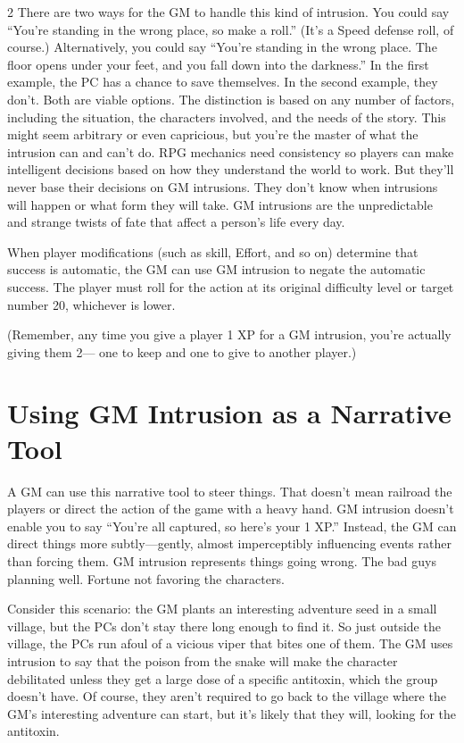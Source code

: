 \begin{multicols}{2}
There are two ways for the GM to handle this kind of intrusion. You could say “You’re standing in the wrong place, so make a roll.” (It’s a Speed defense roll, of course.) Alternatively, you could say “You’re standing in the wrong place. The floor opens under your feet, and you fall down into the darkness.” In the first example, the PC has a chance to save themselves. In the second example, they don’t. Both are viable options. The distinction is based on any number of factors, including the situation, the characters involved, and the needs of the story. This might seem arbitrary or even capricious, but you’re the master of what the intrusion can and can’t do. RPG mechanics need consistency so players can make intelligent decisions based on how they understand the world to work. But they’ll never base their decisions on GM intrusions. They don’t know when intrusions will happen or what form they will take. GM intrusions are the unpredictable and strange twists of fate that affect a person’s life every day.

When player modifications (such as skill, Effort, and so on) determine that success is automatic, the GM can use GM intrusion to negate the automatic success. The player must roll for the action at its original difficulty level or target number 20, whichever is lower.

(Remember, any time you give a player 1 XP for a GM intrusion, you’re actually giving them 2— one to keep and one to give to another player.)

\section{Using GM Intrusion as a Narrative Tool}

A GM can use this narrative tool to steer things. That doesn’t mean railroad the players or direct the action of the game with a heavy hand. GM intrusion doesn’t enable you to say “You’re all captured, so here’s your 1 XP.” Instead, the GM can direct things more subtly—gently, almost imperceptibly influencing events rather than forcing them. GM intrusion represents things going wrong. The bad guys planning well. Fortune not favoring the characters.

Consider this scenario: the GM plants an interesting adventure seed in a small village, but the PCs don’t stay there long enough to find it. So just outside the village, the PCs run afoul of a vicious viper that bites one of them. The GM uses intrusion to say that the poison from the snake will make the character debilitated unless they get a large dose of a specific antitoxin, which the group doesn’t have. Of course, they aren’t required to go back to the village where the GM’s interesting adventure can start, but it’s likely that they will, looking for the antitoxin.


\end{multicols}
